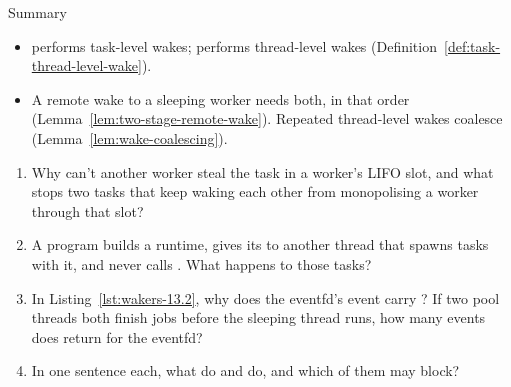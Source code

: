 \begin{quotebox}{Summary}
    \begin{itemize}
        \item {} performs task-level wakes;  performs thread-level wakes (Definition~\ref{def:task-thread-level-wake}).
        \item A remote wake to a sleeping worker needs both, in that order (Lemma~\ref{lem:two-stage-remote-wake}). Repeated thread-level wakes coalesce (Lemma~\ref{lem:wake-coalescing}).
    \end{itemize}
\end{quotebox}

\begin{Exercise}[title={Inside Tokio}]
    \begin{enumerate}
        \item Why can't another worker steal the task in a worker's LIFO slot, and what stops two tasks that keep waking each other from monopolising a worker through that slot?
        \item A program builds a  runtime, gives its  to another thread that spawns tasks with it, and never calls . What happens to those tasks?
        \item In Listing~\ref{lst:wakers-13.2}, why does the eventfd's event carry ? If two pool threads both finish jobs before the sleeping thread runs, how many events does  return for the eventfd?
        \item In one sentence each, what do  and  do, and which of them may block?
    \end{enumerate}
\end{Exercise}
